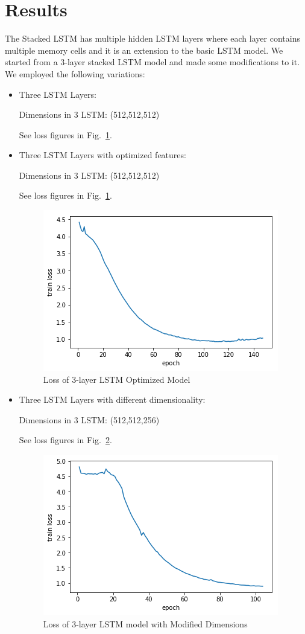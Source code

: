 \documentclass[conference]{IEEEtran}
\begin{document}
\section{Results}
The Stacked LSTM has multiple hidden LSTM layers where each layer contains multiple memory cells and it is an extension to the basic LSTM model. We started from a 3-layer stacked LSTM model and made some modifications to it. We employed the following variations: 
\begin{itemize}
\item Three LSTM Layers: 

Dimensions in 3 LSTM: (512,512,512)

See loss figures in Fig.~\ref{fig1}.

\item Three LSTM Layers with optimized features: 

Dimensions in 3 LSTM: (512,512,512)

See loss figures in Fig.~\ref{fig1}.

\begin{figure}[htbp]
\centerline{\includegraphics[scale=0.6]{loss_optimal.png}}
\caption{Loss of 3-layer LSTM Optimized Model}
\label{fig1}
\end{figure}

\item Three LSTM Layers with different dimensionality:  

Dimensions in 3 LSTM: (512,512,256)

See loss figures in Fig.~\ref{fig2}.

\begin{figure}[htbp]
\centerline{\includegraphics[scale=0.6]{log_to256.png}}
\caption{Loss of 3-layer LSTM model with Modified Dimensions}
\label{fig2}
\end{figure}


\end{itemize}
\end{document}
